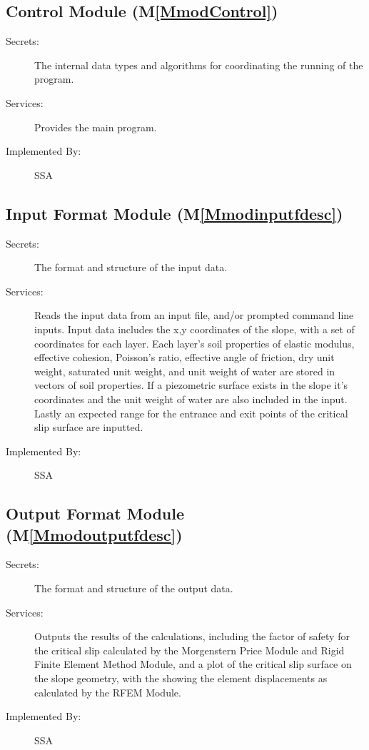 \documentclass[12pt]{article}
\begin{document}
\subsection{Control Module (M\ref{MmodControl})}
\label{Sec:ContModu()}
\begin{description}
\item[Secrets:]The internal data types and algorithms for coordinating the running of the program.
\item[Services:]Provides the main program.
\item[Implemented By:]SSA
\end{description}
\subsection{Input Format Module (M\ref{Mmodinputfdesc})}
\label{Sec:InpuFormModu()}
\begin{description}
\item[Secrets:]The format and structure of the input data.
\item[Services:]Reads the input data from an input file, and/or prompted command line inputs. Input data includes the x,y coordinates of the slope, with a set of coordinates for each layer. Each layer's soil properties of elastic modulus, effective cohesion, Poisson's ratio, effective angle of friction, dry unit weight, saturated unit weight, and unit weight of water are stored in vectors of soil properties. If a piezometric surface exists in the slope it's coordinates and the unit weight of water are also included in the input. Lastly an expected range for the entrance and exit points of the critical slip surface are inputted.
\item[Implemented By:]SSA
\end{description}
\subsection{Output Format Module (M\ref{Mmodoutputfdesc})}
\label{Sec:OutpFormModu()}
\begin{description}
\item[Secrets:]The format and structure of the output data.
\item[Services:]Outputs the results of the calculations, including the factor of safety for the critical slip calculated by the Morgenstern Price Module and Rigid Finite Element Method Module, and a plot of the critical slip surface on the slope geometry, with the showing the element displacements as calculated by the RFEM Module.
\item[Implemented By:]SSA
\end{description}
\end{document}
